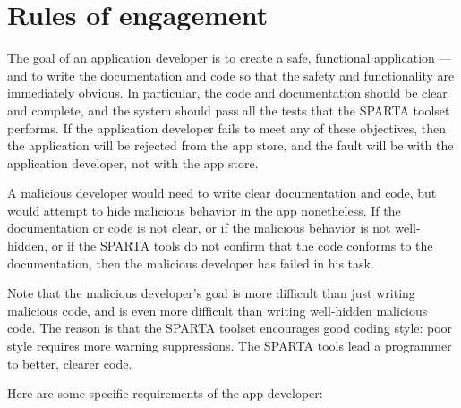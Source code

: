 \htmlhr
\chapter{Rules of engagement\label{rules-of-engagement}}

The goal of an application developer is to create a safe, functional
application --- and to write the documentation and code so that the safety
and functionality are immediately obvious.  In particular, the code and
documentation should be clear and complete, and the system should pass all
the tests that the SPARTA toolset performs.  If the application developer
fails to meet any of these objectives, then the application will be
rejected from the app store, and the fault will be with the application
developer, not with the app store.

A malicious developer would need to write clear documentation and code, but
would attempt to hide malicious behavior in the app nonetheless.  If the
documentation or code is not clear, or if the malicious behavior is not
well-hidden, or if the SPARTA tools do not confirm that the code conforms
to the documentation, then the malicious developer has failed in his task.

Note that the malicious developer's goal is more difficult than just
writing malicious code, and is even more difficult than writing well-hidden
malicious code.  The reason is that the SPARTA toolset encourages good
coding style:  poor style requires more warning suppressions.
The SPARTA tools lead a programmer to better, clearer code.


Here are some specific requirements of the app developer:

